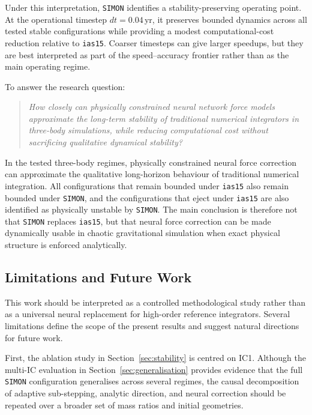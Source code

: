 \documentclass[12pt]{article}
\begin{document}
Under this interpretation, \texttt{SIMON} identifies a stability-preserving operating point.
At the operational timestep $dt=0.04$\,yr, it preserves bounded dynamics across all tested
stable configurations while providing a modest computational-cost reduction relative to
\texttt{ias15}. Coarser timesteps can give larger speedups, but they are best interpreted
as part of the speed--accuracy frontier rather than as the main operating regime.

To answer the research question:
\begin{quote}
\emph{How closely can physically constrained neural network force models approximate the
long-term stability of traditional numerical integrators in three-body simulations, while
reducing computational cost without sacrificing qualitative dynamical stability?}
\end{quote}

\noindent In the tested three-body regimes, physically constrained neural force correction
can approximate the qualitative long-horizon behaviour of traditional numerical
integration. All configurations that remain bounded under \texttt{ias15} also remain
bounded under \texttt{SIMON}, and the configurations that eject under \texttt{ias15} are
also identified as physically unstable by \texttt{SIMON}. The main conclusion is therefore
not that \texttt{SIMON} replaces \texttt{ias15}, but that neural force correction can be made
dynamically usable in chaotic gravitational simulation when exact physical structure is
enforced analytically.

\subsection{Limitations and Future Work}
\label{sec:limitations}

This work should be interpreted as a controlled methodological study rather than as a
universal neural replacement for high-order reference integrators. Several limitations
define the scope of the present results and suggest natural directions for future work.

First, the ablation study in Section~\ref{sec:stability} is centred on IC1. Although the
multi-IC evaluation in Section~\ref{sec:generalisation} provides evidence that the full
\texttt{SIMON} configuration generalises across several regimes, the causal decomposition
of adaptive sub-stepping, analytic direction, and neural correction should be repeated over
a broader set of mass ratios and initial geometries.
\end{document}
